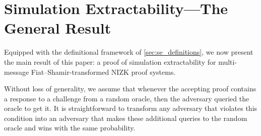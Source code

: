 \section{Simulation Extractability---The General Result}
\label{sec:general}
Equipped with the definitional framework of \cref{sec:se_definitions}, we now present the
main result of this paper: a proof of simulation extractability for multi-message
Fiat--Shamir-transformed NIZK proof systems.




Without loss of generality, we assume that whenever the accepting proof contains a
response to a challenge from a random oracle, then the adversary queried the oracle
to get it. It is straightforward to transform any adversary that violates this
condition into an adversary that makes these additional queries to the random oracle
and wins with the same probability.

